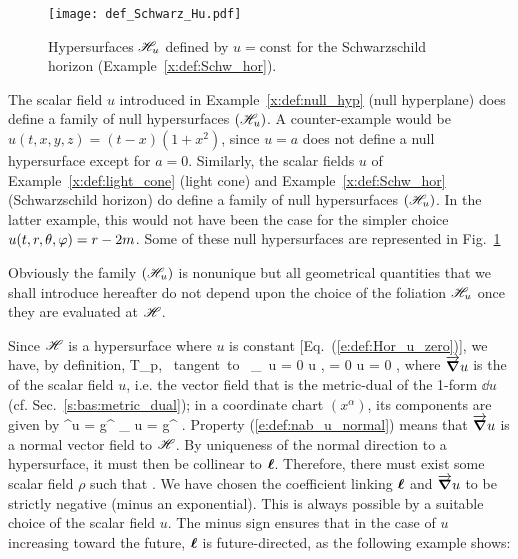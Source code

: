 \begin{figure}
\centerline{\texttt{[image: def\_Schwarz\_Hu.pdf]}}
\caption[]{\label{f:def:Schwarz_Hu} \footnotesize
Hypersurfaces $\mathscr{H}_u$ defined by $u=\mathrm{const}$ for
the Schwarzschild horizon (Example~\ref{x:def:Schw_hor}).}
\end{figure}



\begin{example}
The scalar field $u$ introduced in Example~\ref{x:def:null_hyp}
(null hyperplane) does define a family of null hypersurfaces
$(\mathscr{H}_u)$. A counter-example would be $u(t,x,y,z)=(t-x)(1+x^2)$, since
$u=a$ does not define a null hypersurface except for $a=0$.
Similarly, the scalar fields $u$ of
Example~\ref{x:def:light_cone} (light cone)
and Example~\ref{x:def:Schw_hor} (Schwarzschild horizon)
do define a family of null
hypersurfaces $(\mathscr{H}_u)$.
In the latter example, this would not have been the
case for the simpler choice $u(t,r,\theta,\varphi)  = r - 2m$.
Some of these null hypersurfaces are represented in Fig.~\ref{f:def:Schwarz_Hu}
\end{example}

Obviously the family $(\mathscr{H}_u)$ is nonunique but all geometrical
quantities that we shall introduce hereafter do not depend upon the choice
of the foliation $\mathscr{H}_u$ once they are evaluated at $\mathscr{H}$.

Since $\mathscr{H}$ is a hypersurface where $u$ is constant [Eq.~(\ref{e:def:Hor_u_zero})],
we have, by definition,
\be
    \forall {}\in T_p\M,\quad {} \mbox{\ tangent to\ }\Hor
    \iff  \wnab_{}\,  u = 0
    \iff  \langle \dd u ,  \rangle = 0
    \iff  \vw{\nabla} u \cdot {} = 0 ,   \label{e:def:nab_u_normal}
\ee
where $\overrightarrow{\bm{\nabla}} u$ is the  of the scalar field $u$,
i.e. the vector field that is the metric-dual of the 1-form $\dd u$
(cf. Sec.~\ref{s:bas:metric_dual});
in a coordinate chart $(x^\alpha)$, its components are given by
\be \label{e:def:nab_up_u}
    \nabla^\alpha u = g^{\alpha\mu} \nabla_{\mu} u = g^{\alpha\mu}  .
\ee
Property (\ref{e:def:nab_u_normal}) means that $\overrightarrow{\bm{\nabla}} u$ is
a normal vector field to $\mathscr{H}$. By uniqueness of the normal direction to a hypersurface, it
must then be collinear to $\bm{\ell}$. Therefore, there must exist some scalar
field $\rho$ such that
\be \label{e:def:wl_rho_u}
     .
\ee
We have chosen the
coefficient linking $\bm{\ell}$ and $\overrightarrow{\bm{\nabla}} u $ to be strictly negative
(minus an exponential). This is always possible by a suitable
choice of the scalar field $u$. The minus sign ensures that in the case
of $u$ increasing toward the future, $\bm{\ell}$ is future-directed,
as the following example shows:

